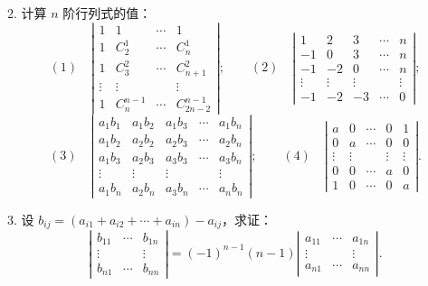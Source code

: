 \documentclass[UTF8, 12pt, fontset=fandol, oneside]{ctexart}
\begin{document}
2. 计算 $n$ 阶行列式的值：
\[
(1)\quad
\left|\begin{array}{cccc}
1 & 1 & \cdots & 1\\
1 & C_2^1 & \cdots & C_n^1\\
1 & C_3^2 & \cdots & C_{n+1}^2\\
\vdots & \vdots & & \vdots\\
1 & C_n^{n-1} & \cdots & C_{2n-2}^{n-1}
\end{array}\right|;
\qquad
(2)\quad
\left|\begin{array}{ccccc}
1 & 2 & 3 & \cdots & n\\
-1 & 0 & 3 & \cdots & n\\
-1 & -2 & 0 & \cdots & n\\
\vdots & \vdots & \vdots & & \vdots\\
-1 & -2 & -3 & \cdots & 0
\end{array}\right|;
\]
\[
(3)\quad
\left|\begin{array}{ccccc}
a_1b_1 & a_1b_2 & a_1b_3 & \cdots & a_1b_n\\
a_1b_2 & a_2b_2 & a_2b_3 & \cdots & a_2b_n\\
a_1b_3 & a_2b_3 & a_3b_3 & \cdots & a_3b_n\\
\vdots & \vdots & \vdots & & \vdots\\
a_1b_n & a_2b_n & a_3b_n & \cdots & a_nb_n
\end{array}\right|;
\qquad
(4)\quad
\left|\begin{array}{ccccc}
a & 0 & \cdots & 0 & 1\\
0 & a & \cdots & 0 & 0\\
\vdots & \vdots & & \vdots & \vdots\\
0 & 0 & \cdots & a & 0\\
1 & 0 & \cdots & 0 & a
\end{array}\right|.
\]

3. 设 $b_{ij}=(a_{i1}+a_{i2}+\cdots+a_{in})-a_{ij}$，求证：
\[
\left|\begin{array}{ccc}
b_{11} & \cdots & b_{1n}\\
\vdots & & \vdots\\
b_{n1} & \cdots & b_{nn}
\end{array}\right|
=(-1)^{n-1}(n-1)
\left|\begin{array}{ccc}
a_{11} & \cdots & a_{1n}\\
\vdots & & \vdots\\
a_{n1} & \cdots & a_{nn}
\end{array}\right|.
\]
\end{document}
